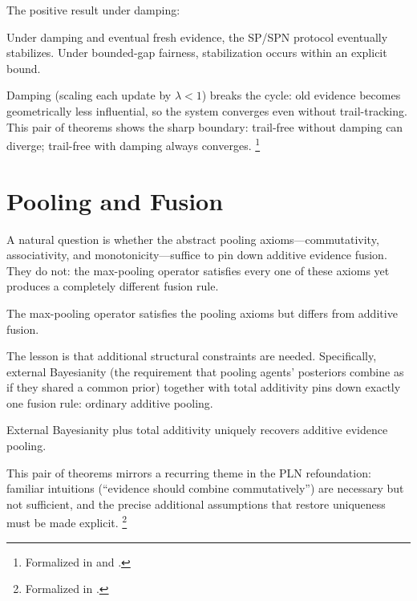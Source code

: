 \documentclass[11pt,openany]{report}
\begin{document}
The positive result under damping:

\begin{theorem}
Under damping and eventual fresh evidence, the SP/SPN protocol eventually
stabilizes.  Under bounded-gap fairness, stabilization occurs within an
explicit bound.
\end{theorem}

\noindent
Damping (scaling each update by $\lambda < 1$) breaks the cycle: old
evidence becomes geometrically less influential, so the system converges
even without trail-tracking.  This pair of theorems shows the sharp
boundary: trail-free without damping can diverge; trail-free with damping
always converges.%
\footnote{Formalized in 
  and .}

\section{Pooling and Fusion}

A natural question is whether the abstract pooling axioms---commutativity,
associativity, and monotonicity---suffice to pin down additive evidence
fusion.  They do not: the max-pooling operator satisfies every one of
these axioms yet produces a completely different fusion rule.

\begin{theorem}
The max-pooling operator satisfies the pooling axioms but differs from
additive fusion.
\end{theorem}

The lesson is that additional structural constraints are needed.
Specifically, external Bayesianity (the requirement that pooling agents'
posteriors combine as if they shared a common prior) together with total
additivity pins down exactly one fusion rule: ordinary additive pooling.

\begin{theorem}
External Bayesianity plus total additivity uniquely recovers additive
evidence pooling.
\end{theorem}

This pair of theorems mirrors a recurring theme in the PLN refoundation:
familiar intuitions (``evidence should combine commutatively'') are
necessary but not sufficient, and the precise additional assumptions that
restore uniqueness must be made explicit.%
\footnote{Formalized in .}
\end{document}
